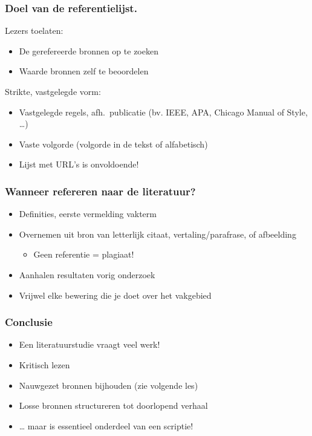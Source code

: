 \documentclass[aspectratio=169]{beamer}
\begin{document}
\begin{frame}[plain]
  \frametitle{Doel van de referentielijst.}

  Lezers toelaten:

  \begin{itemize}
    \item De gerefereerde bronnen op te zoeken
    \item Waarde bronnen zelf te beoordelen
  \end{itemize}

  {\pause}

  Strikte, vastgelegde vorm:

  \begin{itemize}
    \item Vastgelegde regels, afh.~publicatie (bv. IEEE, APA, Chicago Manual of Style, \ldots)
    \item Vaste volgorde (volgorde in de tekst of alfabetisch)
    \item Lijst met URL's is onvoldoende!
  \end{itemize}

  {\pause}

\end{frame}

\begin{frame}
  \frametitle{Wanneer refereren naar de literatuur?}

  \begin{itemize}
    \item Definities, eerste vermelding vakterm
    \item Overnemen uit bron van letterlijk citaat, vertaling/parafrase, of afbeelding
    \begin{itemize}
      \item Geen referentie = \alert{plagiaat!}
    \end{itemize}
    \item Aanhalen resultaten vorig onderzoek
    \item Vrijwel elke bewering die je doet over het vakgebied
  \end{itemize}

  \bigskip

\end{frame}

\begin{frame}
  \frametitle{Conclusie}

  \begin{itemize}
    \item Een literatuurstudie vraagt veel werk!
    \item Kritisch lezen
    \item Nauwgezet bronnen bijhouden (zie volgende les)
    \item Losse bronnen structureren tot doorlopend verhaal
    \item \ldots{} maar is essentieel onderdeel van een scriptie!
  \end{itemize}

\end{frame}
\end{document}
